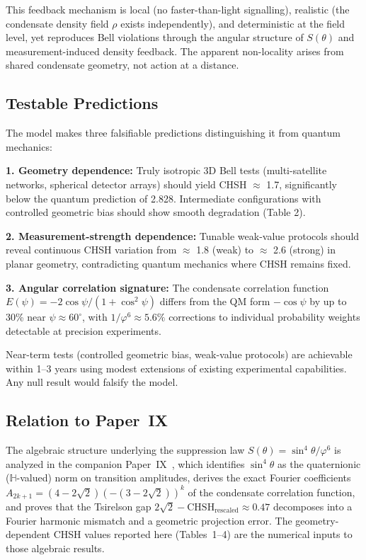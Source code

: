 \documentclass[11pt,a4paper]{article}
\theoremstyle{definition}
\theoremstyle{remark}
\newcommand{\vp}{\varphi}
\newcommand{\HH}{\mathbb{H}}
\newcommand{\CHSH}{\mathrm{CHSH}}
\newcommand{\Tsirelson}{2\sqrt{2}}
\begin{document}
This feedback mechanism is local (no faster-than-light signalling), realistic (the condensate density field $\rho$ exists independently), and deterministic at the field level, yet reproduces Bell violations through the angular structure of $S(\theta)$ and measurement-induced density feedback. The apparent non-locality arises from shared condensate geometry, not action at a distance.

\subsection{Testable Predictions}

The model makes three falsifiable predictions distinguishing it from quantum mechanics:

\textbf{1. Geometry dependence:} Truly isotropic 3D Bell tests (multi-satellite networks, spherical detector arrays) should yield CHSH $\approx$ 1.7, significantly below the quantum prediction of 2.828. Intermediate configurations with controlled geometric bias should show smooth degradation (Table 2).

\textbf{2. Measurement-strength dependence:} Tunable weak-value protocols should reveal continuous CHSH variation from $\approx$ 1.8 (weak) to $\approx$ 2.6 (strong) in planar geometry, contradicting quantum mechanics where CHSH remains fixed.

\textbf{3. Angular correlation signature:} The condensate correlation function $E(\psi)=-2\cos\psi/(1+\cos^2\!\psi)$ differs from the QM form $-\cos\psi$ by up to 30\% near $\psi\approx60^\circ$, with $1/\vp^6\approx5.6\%$ corrections to individual probability weights detectable at precision experiments.

Near-term tests (controlled geometric bias, weak-value protocols) are achievable within 1--3 years using modest extensions of existing experimental capabilities. Any null result would falsify the model.


\subsection{Relation to Paper~IX}
The algebraic structure underlying the suppression law $S(\theta)=\sin^4\theta/\vp^6$
is analyzed in the companion Paper~IX~\cite{Paper9},
which identifies $\sin^4\theta$ as the quaternionic ($\HH$-valued) norm on
transition amplitudes, derives the exact Fourier coefficients
$A_{2k+1}=(4-2\sqrt{2})(-(3-2\sqrt{2}))^k$ of the condensate correlation function,
and proves that the Tsirelson gap $\Tsirelson-\CHSH_{\mathrm{rescaled}}\approx0.47$
decomposes into a Fourier harmonic mismatch and a geometric projection error.
The geometry-dependent CHSH values reported here (Tables~1--4) are the
numerical inputs to those algebraic results.
\end{document}
